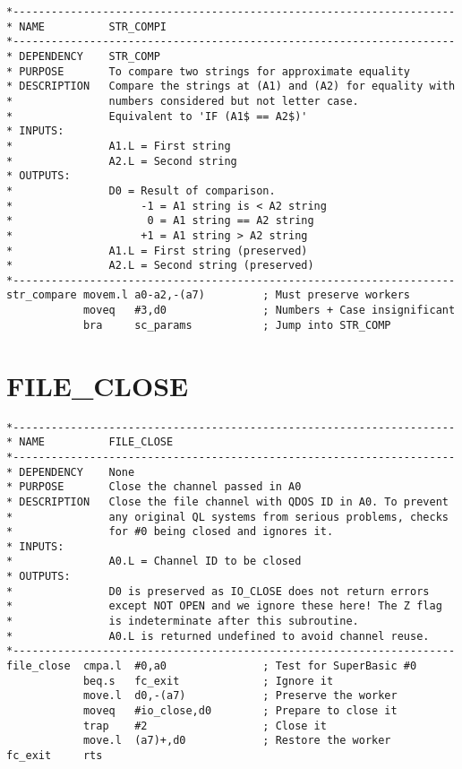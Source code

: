 \begin{lstlisting}[firstnumber=1,caption={STR\_COMPI}]
*---------------------------------------------------------------------
* NAME          STR_COMPI
*---------------------------------------------------------------------
* DEPENDENCY    STR_COMP
* PURPOSE       To compare two strings for approximate equality
* DESCRIPTION   Compare the strings at (A1) and (A2) for equality with
*               numbers considered but not letter case.
*               Equivalent to 'IF (A1$ == A2$)'
* INPUTS:
*               A1.L = First string
*               A2.L = Second string
* OUTPUTS:
*               D0 = Result of comparison.
*                    -1 = A1 string is < A2 string
*                     0 = A1 string == A2 string
*                    +1 = A1 string > A2 string
*               A1.L = First string (preserved)
*               A2.L = Second string (preserved)
*---------------------------------------------------------------------
str_compare movem.l a0-a2,-(a7)         ; Must preserve workers
            moveq   #3,d0               ; Numbers + Case insignificant
            bra     sc_params           ; Jump into STR_COMP
\end{lstlisting}

\section{FILE\_CLOSE}
\label{ch9-FILE_CLOSE}%

\begin{lstlisting}[firstnumber=1,caption={FILE\_CLOSE}]
*---------------------------------------------------------------------
* NAME          FILE_CLOSE
*---------------------------------------------------------------------
* DEPENDENCY    None
* PURPOSE       Close the channel passed in A0
* DESCRIPTION   Close the file channel with QDOS ID in A0. To prevent
*               any original QL systems from serious problems, checks
*               for #0 being closed and ignores it.
* INPUTS:
*               A0.L = Channel ID to be closed
* OUTPUTS:
*               D0 is preserved as IO_CLOSE does not return errors
*               except NOT OPEN and we ignore these here! The Z flag 
*               is indeterminate after this subroutine.
*               A0.L is returned undefined to avoid channel reuse.
*---------------------------------------------------------------------
file_close  cmpa.l  #0,a0               ; Test for SuperBasic #0
            beq.s   fc_exit             ; Ignore it
            move.l  d0,-(a7)            ; Preserve the worker
            moveq   #io_close,d0        ; Prepare to close it
            trap    #2                  ; Close it
            move.l  (a7)+,d0            ; Restore the worker
fc_exit     rts
\end{lstlisting}

